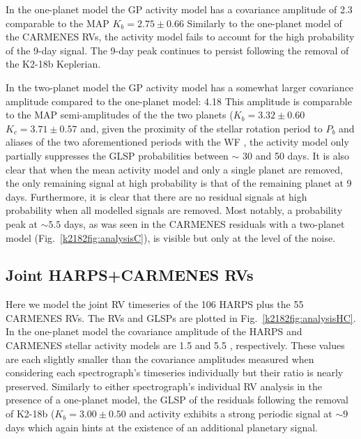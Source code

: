 In the one-planet model the GP activity model has a covariance amplitude of 2.3 \mps{,} comparable to the
MAP $K_b=2.75\pm 0.66$ 
Similarly to the one-planet model of the CARMENES RVs, the activity model fails to account for
the high probability of the 9-day signal. The 9-day peak continues to persist following the removal of
the K2-18b Keplerian.  

In the two-planet model the GP activity model has a somewhat larger covariance amplitude compared to
the one-planet model: 4.18  This amplitude is comparable to the MAP semi-amplitudes of the
the two planets ($K_b=3.32\pm 0.60$ \mps{,} $K_c=3.71\pm 0.57$ \mps{)} and,
given the proximity of the stellar rotation period to $P_b$ and aliases of the two aforementioned periods with
the WF , the activity model only partially suppresses the GLSP probabilities between
$\sim$ 30 and 50 days. It is also clear that when the mean activity model and only a single planet are
removed, the only remaining signal at high probability is that of the remaining planet at 9 days. Furthermore, it
is clear that there are no residual signals at high probability when all modelled signals are removed. 
Most notably, a probability peak at $\sim 5.5$ days, as was seen in the CARMENES residuals with a
two-planet model (Fig.~\ref{k2182fig:analysisC}), is visible but only at the level of the noise.


\subsection{Joint HARPS+CARMENES RVs}
Here we model the joint RV timeseries of the 106 HARPS plus the 55 CARMENES RVs.
The RVs and GLSPs are plotted in Fig.~\ref{k2182fig:analysisHC}. In the one-planet model the
covariance amplitude of the HARPS and CARMENES stellar activity models are 1.5 and 5.5 \mps{}, respectively.
These values are each slightly smaller than the covariance amplitudes measured when considering each
spectrograph's timeseries individually but their ratio is nearly preserved.
Similarly to either spectrograph's individual RV analysis in the presence of a one-planet
model, the GLSP of the residuals following the removal of K2-18b ($K_b=3.00\pm 0.50$ \mps{)}
and activity exhibits a strong periodic signal
at $\sim 9$ days which again hints at the existence of an additional planetary signal.

